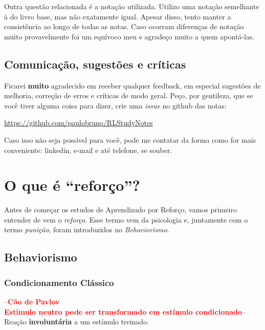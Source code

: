 \documentclass{article}
\newcommand{\todo}[1]{ --\textcolor{red}{\textbf{#1}}--}
\begin{document}
            Outra questão relacionada é a notação utilizada. Utilizo uma notação semelhante à do livro base, mas não exatamente igual. Apesar disso, tento manter a consistência ao longo de todas as notas. Caso ocorram diferenças de notação muito provavelmente foi um equívoco meu e agradeço muito a quem apontá-las.
            
        \subsection{Comunicação, sugestões e críticas}
            
            Ficarei \textbf{muito} agradecido em receber qualquer feedback, em especial sugestões de melhoria, correção de erros e críticas de modo geral. Peço, por gentileza, que se você tiver alguma coisa para dizer, crie uma \emph{issue} no github das notas:
            
            \begin{center}
                \url{https://github.com/paulobruno/RLStudyNotes}
            \end{center}
            
            Caso isso não seja possível para você, pode me contatar da forma como for mais conveniente: linkedin, e-mail e até telefone, se souber.
            
    \section{O que é ``reforço''?}
    
        Antes de começar os estudos de Aprendizado por Reforço, vamos primeiro entender de vem o \emph{reforço}. Esse termo vem da psicologia e, juntamente com o termo \emph{punição}, foram introduzidos no \emph{Behaviorismo}.
    
        \subsection{Behaviorismo}
        
            \subsubsection{Condicionamento Clássico}
            
                \todo{Cão de Pavlov\\
                Estímulo neutro pode ser transformado em estímulo condicionado}
                Reação \textbf{involuntária} a um estímulo treinado.
            
\end{document}
